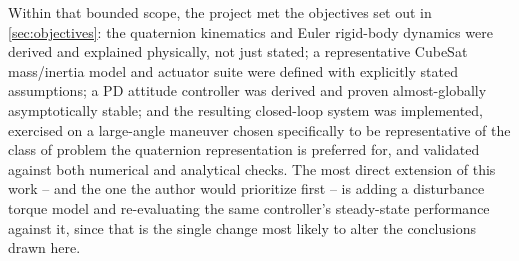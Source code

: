 Within that bounded scope, the project met the objectives set out in \cref{sec:objectives}: the quaternion kinematics and Euler rigid-body dynamics were derived and explained physically, not just stated; a representative CubeSat mass/inertia model and actuator suite were defined with explicitly stated assumptions; a PD attitude controller was derived and proven almost-globally asymptotically stable; and the resulting closed-loop system was implemented, exercised on a large-angle maneuver chosen specifically to be representative of the class of problem the quaternion representation is preferred for, and validated against both numerical and analytical checks. The most direct extension of this work -- and the one the author would prioritize first -- is adding a disturbance torque model and re-evaluating the same controller's steady-state performance against it, since that is the single change most likely to alter the conclusions drawn here.
